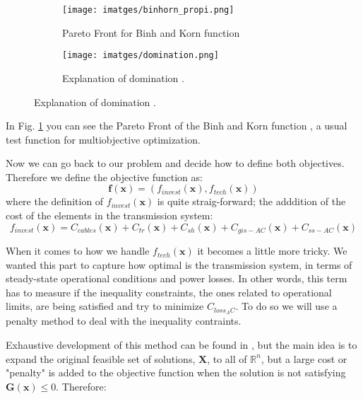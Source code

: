 \documentclass[a4paper,11pt, titlepage, twoside]{article}
\begin{document}
\begin{figure}[H]
    \centering
    \begin{subfigure}{0.45\textwidth}
        \centering
        \texttt{[image: imatges/binhorn\_propi.png]}
        \caption{Pareto Front for Binh and Korn function}
        \label{fig:paretobinhorn}
    \end{subfigure}\hfill
    \begin{subfigure}{0.45\textwidth}
        \centering
        \texttt{[image: imatges/domination.png]}
        \caption{Explanation of domination \cite{domination}.}
        \label{fig:domination}
    \end{subfigure}
    \label{fig:both_images}
\end{figure}

In Fig. \ref{fig:paretobinhorn} you can see the Pareto Front of the Binh and Korn function \cite{binhorn}, a usual test function for multiobjective optimization.

Now we can go back to our problem and decide how to define both objectives. Therefore we define the objective function as:
\begin{equation}
    \mathbf{f}(\mathbf{x}) =(f_{invest}(\mathbf{x}),f_{tech}(\mathbf{x}))
\end{equation}
where the definition of $f_{invest}(\mathbf{x})$ is quite straig-forward; the adddition of the cost of the elements in the transmission system:
\begin{equation}
    f_{invest}(\mathbf{x}) = C_{cables}(\mathbf{x}) + C_{tr}(\mathbf{x}) + C_{sh}(\mathbf{x}) + C_{gis-AC}(\mathbf{x}) + C_{ss-AC}(\mathbf{x})
\end{equation}

When it comes to how we handle  $f_{tech}(\mathbf{x})$ it becomes a little more tricky. We wanted this part to capture how optimal is the transmission system, in terms of steady-state operational conditions and power losses. In other words, this term has to measure if the inequality constraints, the ones related to operational
limits, are being satisfied and try to minimize $C_{loss_AC}$. To do so we will use a penalty method to deal with the inequality contraints.\par

Exhaustive development of this method can be found in \cite{penalty}, but the main idea is to expand the original feasible set of solutions, $ \mathbf{X}$, to all of $\mathbb{R}^n$, but a large cost or "penalty" is added to the objective function when the solution is not satisfying
 $\mathbf{G(x)} \leq 0 $. Therefore:
\end{document}
